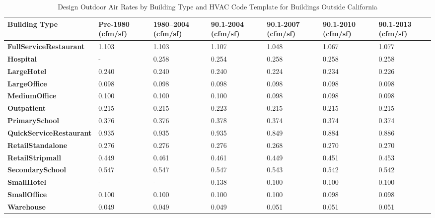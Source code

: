 \begin{table}
\small
\centering
\caption[Design Outdoor Air Rates---Outside California]{Design Outdoor Air Rates by Building Type and HVAC Code Template for Buildings Outside California}
\label{tab:outdoor_air_table}
\begin{tabular}{|p{2.5cm}|p{1.4cm}|p{1.4cm}|p{1.4cm}|p{1.4cm}|p{1.4cm}|p{1.4cm}|}
\hline
\textbf{Building   Type} &
  \textbf{Pre-1980 (cfm/sf)} &
  \textbf{1980--2004   (cfm/sf)} &
  \textbf{90.1-2004 (cfm/sf)} &
  \textbf{90.1-2007 (cfm/sf)} &
  \textbf{90.1-2010 (cfm/sf)} &
  \textbf{90.1-2013 (cfm/sf)} \\ \hline
\textbf{FullService\-Restaurant}  & 1.103 & 1.103 & 1.107 & 1.048 & 1.067 & 1.077 \\ \hline
\textbf{Hospital}                 & -     & 0.258 & 0.254 & 0.258 & 0.258 & 0.258 \\ \hline
\textbf{LargeHotel}               & 0.240 & 0.240 & 0.240 & 0.224 & 0.234 & 0.226 \\ \hline
\textbf{LargeOffice}              & 0.098 & 0.098 & 0.098 & 0.098 & 0.098 & 0.098 \\ \hline
\textbf{MediumOffice}             & 0.100 & 0.100 & 0.100 & 0.098 & 0.098 & 0.098 \\ \hline
\textbf{Outpatient}               & 0.215 & 0.215 & 0.223 & 0.215 & 0.215 & 0.215 \\ \hline
\textbf{PrimarySchool}            & 0.376 & 0.376 & 0.378 & 0.374 & 0.374 & 0.374 \\ \hline
\textbf{QuickService\-Restaurant} & 0.935 & 0.935 & 0.935 & 0.849 & 0.884 & 0.886 \\ \hline
\textbf{RetailStandalone}         & 0.276 & 0.276 & 0.276 & 0.268 & 0.270 & 0.270 \\ \hline
\textbf{RetailStripmall}          & 0.449 & 0.461 & 0.461 & 0.449 & 0.451 & 0.453 \\ \hline
\textbf{SecondarySchool}          & 0.547 & 0.547 & 0.547 & 0.543 & 0.542 & 0.542 \\ \hline
\textbf{SmallHotel}               & -     & -     & 0.138 & 0.100 & 0.100 & 0.100 \\ \hline
\textbf{SmallOffice}              & 0.100 & 0.100 & 0.100 & 0.100 & 0.098 & 0.098 \\ \hline
\textbf{Warehouse}                & 0.049 & 0.049 & 0.049 & 0.051 & 0.051 & 0.051 \\ \hline
\end{tabular}
\end{table}